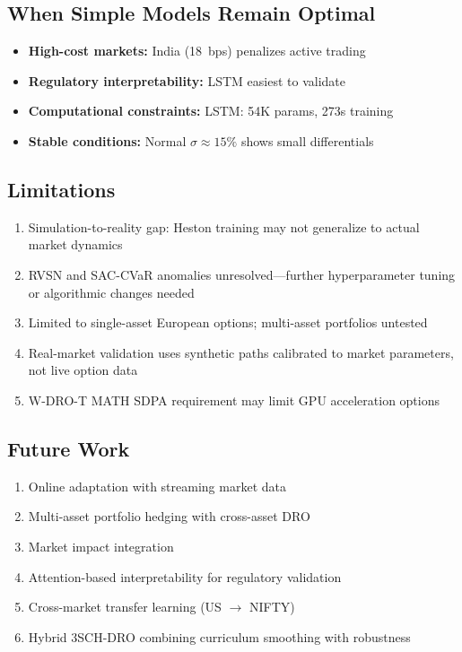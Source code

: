\documentclass[11pt]{article}
\begin{document}
\subsection{When Simple Models Remain Optimal}

\begin{itemize}[noitemsep]
    \item \textbf{High-cost markets:} India (18~bps) penalizes active trading
    \item \textbf{Regulatory interpretability:} LSTM easiest to validate
    \item \textbf{Computational constraints:} LSTM: 54K params, 273s training
    \item \textbf{Stable conditions:} Normal $\sigma \approx 15\%$ shows small differentials
\end{itemize}

\subsection{Limitations}

\begin{enumerate}[noitemsep,leftmargin=*]
    \item Simulation-to-reality gap: Heston training may not generalize to actual market dynamics
    \item RVSN and SAC-CVaR anomalies unresolved---further hyperparameter tuning or algorithmic changes needed
    \item Limited to single-asset European options; multi-asset portfolios untested
    \item Real-market validation uses synthetic paths calibrated to market parameters, not live option data
    \item W-DRO-T MATH SDPA requirement may limit GPU acceleration options
\end{enumerate}

\subsection{Future Work}

\begin{enumerate}[noitemsep,leftmargin=*]
    \item Online adaptation with streaming market data
    \item Multi-asset portfolio hedging with cross-asset DRO
    \item Market impact integration~\citep{pickard2025rl}
    \item Attention-based interpretability for regulatory validation
    \item Cross-market transfer learning (US $\to$ NIFTY)
    \item Hybrid 3SCH-DRO combining curriculum smoothing with robustness
\end{enumerate}
\end{document}
